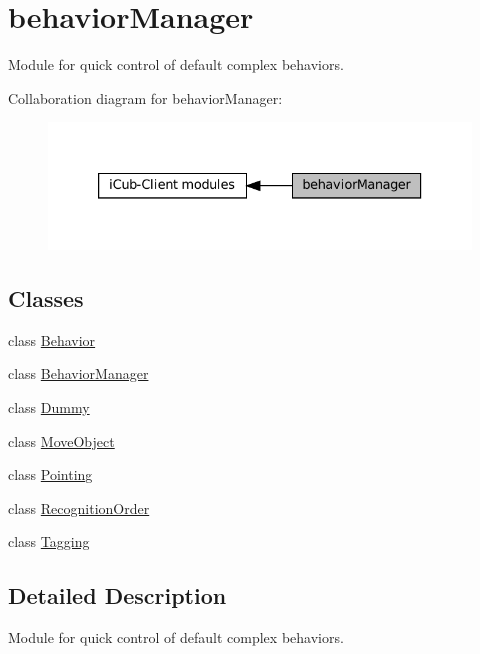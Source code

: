 \hypertarget{group__behaviorManager}{}\section{behavior\+Manager}
\label{group__behaviorManager}


Module for quick control of default complex behaviors.  


Collaboration diagram for behavior\+Manager\+:
\nopagebreak
\begin{figure}[H]
\begin{center}
\leavevmode
\includegraphics[width=333pt]{group__behaviorManager}
\end{center}
\end{figure}
\subsection*{Classes}
\begin{DoxyCompactItemize}
\item 
class \hyperlink{group__behaviorManager_classBehavior}{Behavior}
\item 
class \hyperlink{group__behaviorManager_classBehaviorManager}{Behavior\+Manager}
\item 
class \hyperlink{group__behaviorManager_classDummy}{Dummy}
\item 
class \hyperlink{group__behaviorManager_classMoveObject}{Move\+Object}
\item 
class \hyperlink{group__behaviorManager_classPointing}{Pointing}
\item 
class \hyperlink{group__behaviorManager_classRecognitionOrder}{Recognition\+Order}
\item 
class \hyperlink{group__behaviorManager_classTagging}{Tagging}
\end{DoxyCompactItemize}


\subsection{Detailed Description}
Module for quick control of default complex behaviors. 

